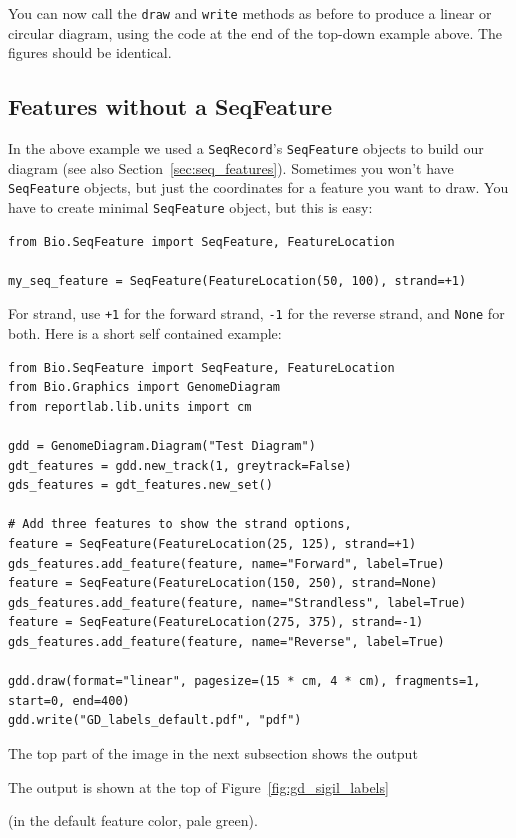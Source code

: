 You can now call the \verb|draw| and \verb|write| methods as before to produce
a linear or circular diagram, using the code at the end of the top-down example
above.  The figures should be identical.

\subsection{Features without a SeqFeature}
\label{sec:gd_features_without_seqfeatures}

In the above example we used a \verb|SeqRecord|'s \verb|SeqFeature| objects
to build our diagram (see also Section~\ref{sec:seq_features}).
Sometimes you won't have \verb|SeqFeature| objects,
but just the coordinates for a feature you want to draw.  You have to create
minimal \verb|SeqFeature| object, but this is easy:

\begin{verbatim}
from Bio.SeqFeature import SeqFeature, FeatureLocation

my_seq_feature = SeqFeature(FeatureLocation(50, 100), strand=+1)
\end{verbatim}

For strand, use \texttt{+1} for the forward strand, \texttt{-1} for the
reverse strand, and \texttt{None} for both.  Here is a short self contained
example:

\begin{verbatim}
from Bio.SeqFeature import SeqFeature, FeatureLocation
from Bio.Graphics import GenomeDiagram
from reportlab.lib.units import cm

gdd = GenomeDiagram.Diagram("Test Diagram")
gdt_features = gdd.new_track(1, greytrack=False)
gds_features = gdt_features.new_set()

# Add three features to show the strand options,
feature = SeqFeature(FeatureLocation(25, 125), strand=+1)
gds_features.add_feature(feature, name="Forward", label=True)
feature = SeqFeature(FeatureLocation(150, 250), strand=None)
gds_features.add_feature(feature, name="Strandless", label=True)
feature = SeqFeature(FeatureLocation(275, 375), strand=-1)
gds_features.add_feature(feature, name="Reverse", label=True)

gdd.draw(format="linear", pagesize=(15 * cm, 4 * cm), fragments=1, start=0, end=400)
gdd.write("GD_labels_default.pdf", "pdf")
\end{verbatim}

\begin{htmlonly}
The top part of the image in the next subsection shows the output
\end{htmlonly}
\begin{latexonly}
The output is shown at the top of Figure~\ref{fig:gd_sigil_labels}
\end{latexonly}
(in the default feature color, pale green).

